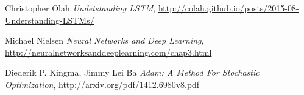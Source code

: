 \documentclass{article} %
\begin{document}
\newpage

\begin{thebibliography}{9}

  Christopher Olah
  \emph{Undetstanding LSTM},
\url{http://colah.github.io/posts/2015-08-Understanding-LSTMs/}

  Michael Nielsen
  \emph{Neural Networks and Deep Learning},
\url{http://neuralnetworksanddeeplearning.com/chap3.html}

  Diederik P. Kingma, Jimmy Lei Ba
  \emph{Adam: A Method For Stochastic Optimization},
http://arxiv.org/pdf/1412.6980v8.pdf
\end{thebibliography}
\end{document}
